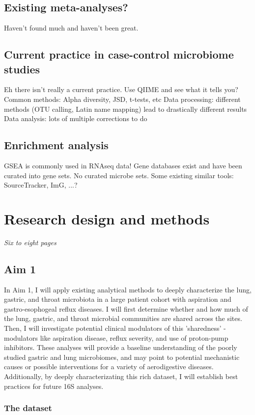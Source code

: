 \documentclass[12pt]{article}
\begin{document}
\subsection*{Existing meta-analyses?}
Haven't found much and haven't been great.

\subsection*{Current practice in case-control microbiome studies}
Eh there isn't really a current practice. Use QIIME and see what it tells you?
Common methods: Alpha diversity, JSD, t-tests, etc
Data processing: different methods (OTU calling, Latin name mapping) lead to drastically different results
Data analysis: lots of multiple corrections to do

\subsection*{Enrichment analysis}
GSEA is commonly used in RNAseq data! Gene databases exist and have been curated into gene sets.
No curated microbe sets. Some existing similar tools: SourceTracker, ImG, ...?

\section{Research design and methods}
\textit{Six to eight pages}
\subsection{Aim 1}
In Aim 1, I will apply existing analytical methods to deeply characterize the lung, gastric, and throat microbiota in a large patient cohort with aspiration and gastro-esophogeal reflux diseases. I will first determine whether and how much of the lung, gastric, and throat microbial communities are shared across the sites. Then, I will investigate potential clinical modulators of this 'sharedness' - modulators like aspiration disease, reflux severity, and use of proton-pump inhibitors. These analyses will provide a baseline understanding of the poorly studied gastric and lung microbiomes, and may point to potential mechanistic causes or possible interventions for a variety of aerodigestive diseases. Additionally, by deeply characterizating this rich dataset, I will establish best practices for future 16S analyses.

\subsubsection{The dataset}
\end{document}
